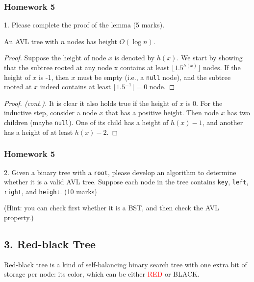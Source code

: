 \documentclass[aspectratio=169, 14pt]{beamer}
\begin{document}
\begin{frame}
    \frametitle{Homework 5}
1. Please complete the proof of the lemma (5 marks).
  \begin{lemma}
    An AVL tree with $n$ nodes has height $O(\log{n})$. 
    \end{lemma} 
    \begin{proof}
    Suppose the height of node $x$ is denoted by $h(x)$. We start by showing that \alert{the subtree rooted at any node x contains at least $\lfloor 1.5^{h(x)} \rfloor$ nodes}. If the height of $x$ is -1, then $x$ must be empty (i.e., a \texttt{null} node), and the subtree rooted at $x$ indeed contains at least $\lfloor 1.5^{-1} \rfloor = 0$ node.
    \end{proof}
    \end{frame}
    
    \begin{frame}
        \begin{proof}[Proof. (cont.)]
            It is clear it also holds true if the height of $x$ is 0. For the inductive step, consider a node $x$ that has a positive height. Then node $x$ has two children (maybe \texttt{null}). One of its child has a height of $h(x)-1$, and another has a height of at least $h(x) - 2$. 
            
            \end{proof}
    \end{frame}

\begin{frame}
    \frametitle{Homework 5}
2. Given a binary tree with a \texttt{root}, please develop an algorithm to determine whether it is a valid AVL tree. Suppose each node in the tree contains \texttt{key}, \texttt{left}, \texttt{right}, and \texttt{height}. (10 marks)

(\small{Hint: you can check first whether it is a BST, and then check the AVL property.})

\end{frame}

\begin{frame}

    \section{\textcolor{darkmidnightblue}{3. Red-black Tree}} 
    Red-black tree is a kind of self-balancing binary search tree with one extra bit of storage per node: its color, which can be either \textcolor{red}{RED} or BLACK. 
\end{frame}
\end{document}
